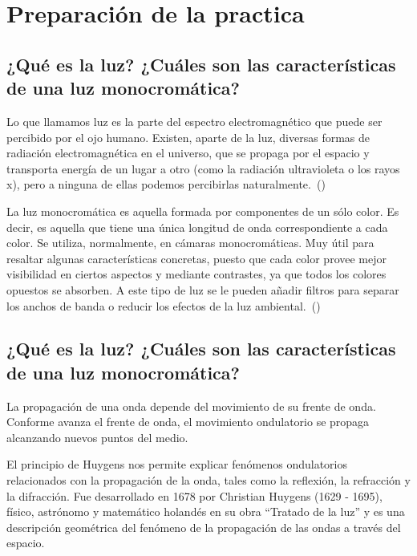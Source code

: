 \documentclass[twocolumn, 12pt]{article}
\begin{document}
\section{Preparación de la practica}

\subsection{¿Qué es la luz? ¿Cuáles son las características de una luz monocromática?}

Lo que llamamos luz es la parte del espectro
electromagnético que puede ser percibido por el ojo humano.
Existen, aparte de la luz, diversas formas de radiación
electromagnética en el universo, que se propaga por el
espacio y transporta energía de un lugar a otro (como la
radiación ultravioleta o los rayos x), pero a ninguna de
ellas podemos percibirlas
naturalmente.~(\cite{concepto-luz})

La luz monocromática es aquella formada por componentes de
un sólo color. Es decir, es aquella que tiene una única
longitud de onda correspondiente a cada color. Se utiliza,
normalmente, en cámaras monocromáticas. Muy útil para
resaltar algunas características concretas, puesto que cada
color provee mejor visibilidad en ciertos aspectos y
mediante contrastes, ya que todos los colores opuestos se
absorben. A este tipo de luz se le pueden añadir filtros
para separar los anchos de banda o reducir los efectos de
la luz ambiental.~(\cite{concepto-luz-monocromatica})

\subsection{¿Qué es la luz? ¿Cuáles son las características de una luz monocromática?}

La propagación de una onda depende del movimiento de su
frente de onda. Conforme avanza el frente de onda, el
movimiento ondulatorio se propaga alcanzando nuevos puntos
del medio.

El principio de Huygens nos permite explicar fenómenos
ondulatorios relacionados con la propagación de la onda,
tales como la reflexión, la refracción y la difracción. Fue
desarrollado en 1678 por Christian Huygens (1629 - 1695),
físico, astrónomo y matemático holandés en su obra
``Tratado de la luz'' y es una descripción geométrica del
fenómeno de la propagación de las ondas a través del
espacio.
\end{document}
